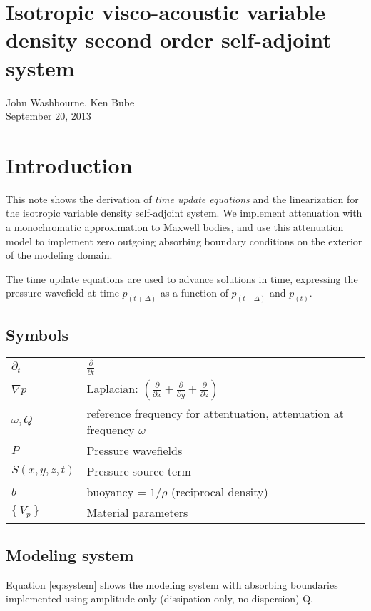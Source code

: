 \documentclass[10pt,fleqn]{article}
\begin{document}
\section{Isotropic visco-acoustic variable density second order self-adjoint system}
John Washbourne, Ken Bube\\
September 20, 2013

\section{Introduction}
This note shows the derivation of \textit{time update equations} and the linearization 
for the isotropic
variable density self-adjoint system. We implement attenuation with a monochromatic
approximation to Maxwell bodies, and use this attenuation model to implement zero
outgoing absorbing boundary conditions on the exterior of the modeling domain.
\vspace{10pt}

The time update equations are used to advance solutions in time, expressing the pressure
wavefield at time $p_{(t + \Delta)}$ as a function of $p_{(t - \Delta)}$ and $p_{(t)}$.

\subsection{Symbols}
\begin{center}
\begin{tabular}{ll} \\[-10pt]
$\partial_t$ & $\displaystyle \frac{\partial }{\partial t}$ \\[10pt]
$\nabla p $ & Laplacian: $ \left(
	\displaystyle \frac{\partial }{\partial x} +
	\displaystyle \frac{\partial }{\partial y} +
	\displaystyle \frac{\partial }{\partial z} \right) $ \\[10pt]
$\omega, Q$ & reference frequency for attentuation, attenuation at frequency $\omega$ \\[10pt]
$P$ & Pressure wavefields\\[10pt]
$S(x,y,z,t)$ & Pressure source term\\[10pt]
$b$ & buoyancy = $\displaystyle 1/\rho $ (reciprocal density) \\[10pt]
$ \{\ V_p\ \} $ & Material parameters \\[10pt]
\end{tabular}
\end{center}

\subsection{Modeling system}
Equation \ref{eq:system} shows the modeling system with absorbing boundaries
implemented using amplitude only (dissipation only, no dispersion) Q.
\vspace{10pt}
\end{document}
